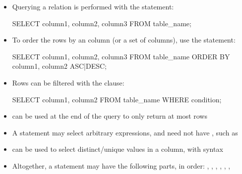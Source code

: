 \documentclass[a4paper]{article}
\begin{document}
\begin{itemize}
    \item Querying a relation is performed with the  statement:
    \begin{sql}
SELECT column1, column2, column3
FROM table_name;
\end{sql}
\item To order the rows by an column (or a set of columns), use the  statement:
    \begin{sql}
SELECT column1, column2, column3
FROM table_name
ORDER BY column1, column2 ASC|DESC;
\end{sql}
\item Rows can be filtered with the  clause:
    \begin{sql}
SELECT column1, column2
FROM table_name
WHERE condition;\end{sql}
\item {} can be used at the end of the query to only return at most  rows
\item A  statement may select arbitrary expressions, and need not have , such as 
\item {} can be used to select distinct/unique values in a column, with syntax 
\item Altogether, a  statement may have the following parts, in order: , , , , , , 
\end{itemize}
\end{document}

